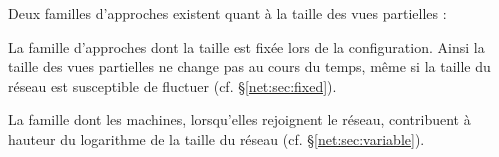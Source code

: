 Deux familles d'approches existent quant à la taille des vues partielles :
\begin{inparaenum}[(i)]
\item La famille d'approches dont la taille est fixée lors de la
  configuration. Ainsi la taille des vues partielles ne change pas au cours du
  temps, même si la taille du réseau est susceptible de fluctuer
  (cf. §\ref{net:sec:fixed}).
\item La famille dont les machines, lorsqu'elles rejoignent le réseau,
  contribuent à hauteur du logarithme de la taille du réseau
  (cf. §\ref{net:sec:variable}).
\end{inparaenum}

